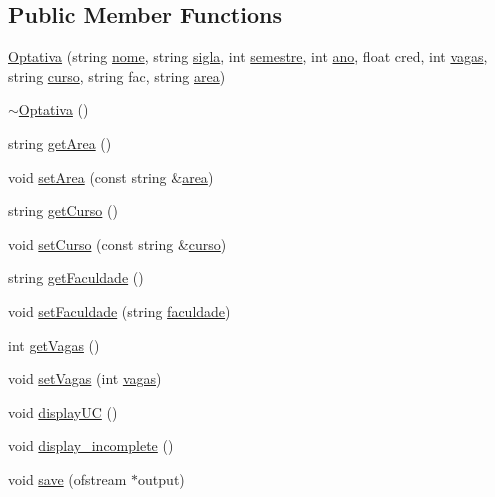 \subsection*{Public Member Functions}
\begin{DoxyCompactItemize}
\item 
\hyperlink{class_optativa_a276b885ae681b87285f428c9b819b486}{Optativa} (string \hyperlink{class_uc_af2971baa3ea283ba5fec29170de3fbe9}{nome}, string \hyperlink{class_uc_a5d6fb389c3634d6c4f4b92877e4e0e39}{sigla}, int \hyperlink{class_uc_a5e91075b035d68f536d35683c50c9bae}{semestre}, int \hyperlink{class_uc_aefaa6dc015733603451294d3e2efaa83}{ano}, float cred, int \hyperlink{class_optativa_a7502cd3259bb95dd8ceb3af9a8eb326a}{vagas}, string \hyperlink{class_optativa_a16a774ceaeb9ff2e4755540e01ee7a03}{curso}, string fac, string \hyperlink{class_optativa_ac4fb0a80ff662efca795bf932bea9a77}{area})
\item 
\hyperlink{class_optativa_a9a32ddeaa6e1bddcf55fa5805e2c06ec}{$\sim$\+Optativa} ()
\item 
string \hyperlink{class_optativa_a3f02a824fbfaf7ad5f395b9bd9037ef3}{get\+Area} ()
\item 
void \hyperlink{class_optativa_ab672565bcd303892644444ed6c607ec5}{set\+Area} (const string \&\hyperlink{class_optativa_ac4fb0a80ff662efca795bf932bea9a77}{area})
\item 
string \hyperlink{class_optativa_a79d38d1290190327c812c3eb16f310f6}{get\+Curso} ()
\item 
void \hyperlink{class_optativa_a3d34759cecccd98c4edd1cd834b5d622}{set\+Curso} (const string \&\hyperlink{class_optativa_a16a774ceaeb9ff2e4755540e01ee7a03}{curso})
\item 
string \hyperlink{class_optativa_a647029a53dd8c9c5b997730e57981a05}{get\+Faculdade} ()
\item 
void \hyperlink{class_optativa_a4f96f2082762900b85660e0fd4bff682}{set\+Faculdade} (string \hyperlink{class_optativa_aba2a76842ec9cf99d8ee4f6b5ad37019}{faculdade})
\item 
int \hyperlink{class_optativa_a675d4750bbe112a1b3d2c0b6bf64a94b}{get\+Vagas} ()
\item 
void \hyperlink{class_optativa_a5b123e4f96894d9ff8fb4e6f500ce40d}{set\+Vagas} (int \hyperlink{class_optativa_a7502cd3259bb95dd8ceb3af9a8eb326a}{vagas})
\item 
void \hyperlink{class_optativa_a48019eb60424bdad456c22c7c7656082}{display\+UC} ()
\item 
void \hyperlink{class_optativa_a6e8cf85b9ccacb15ad7a217f55120b9f}{display\+\_\+incomplete} ()
\item 
void \hyperlink{class_optativa_afcfc090c02bffe03c1316d1f00b0dca3}{save} (ofstream $\ast$output)
\end{DoxyCompactItemize}
